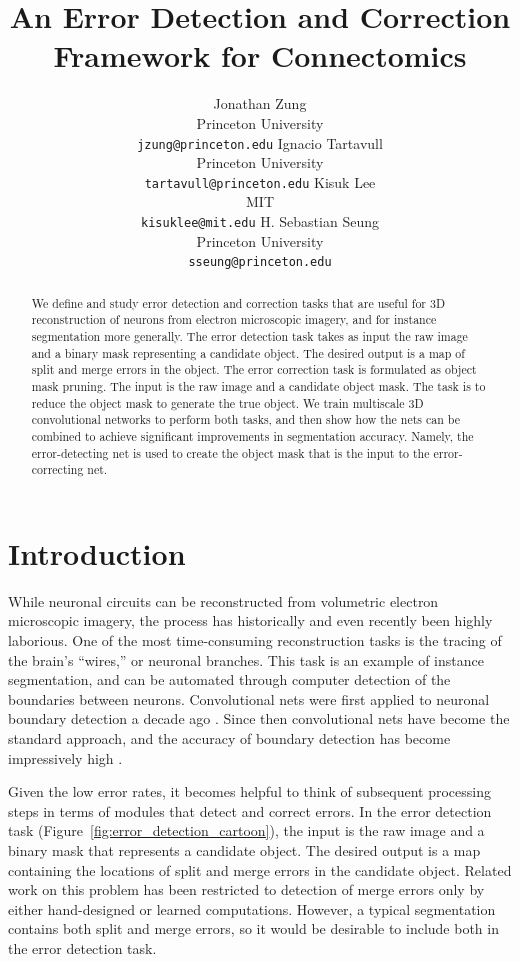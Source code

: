 \documentclass{article}
\title{An Error Detection and Correction Framework for Connectomics}
\author{
	Jonathan Zung\\
	Princeton University\\
	{\tt jzung@princeton.edu}
	\And
	Ignacio Tartavull\\
	Princeton University\\
	{\tt tartavull@princeton.edu}
	\And
	Kisuk Lee\\
	MIT\\
	{\tt kisuklee@mit.edu}
	\And
    H. Sebastian Seung\\
	Princeton University\\
	{\tt sseung@princeton.edu}
}
\begin{document}
\maketitle

\begin{abstract}
We define and study error detection and correction tasks that are
useful for 3D reconstruction of neurons from electron microscopic
imagery, and for instance segmentation more generally.  The error
detection task takes as input the raw image and a binary mask
representing a candidate object. The desired output is a map of split
and merge errors in the object. The error correction task is
formulated as object mask pruning. The input is the raw image
and a candidate object mask. The task is to reduce the object mask to
generate the true object. We train multiscale 3D convolutional
networks to perform both tasks, and then show how the nets can be
combined to achieve significant improvements in segmentation
accuracy. Namely, the error-detecting net is used to create the
object mask that is the input to the error-correcting net.
\end{abstract}

\section{Introduction}
While neuronal circuits can be reconstructed from volumetric electron
microscopic imagery, the process has historically
\cite{white1986structure} and even recently \cite{schmidt2017axonal}
been highly laborious. One of the most time-consuming reconstruction
tasks is the tracing of the brain's ``wires,'' or neuronal branches.
This task is an example of instance segmentation, and can be automated through computer detection of the boundaries between neurons. Convolutional nets were first applied to neuronal boundary detection a decade ago \cite{jain2007supervised, boundary_detection}.
Since then convolutional nets have become the standard approach, and
the accuracy of boundary detection has become impressively high  \cite{zeng2017deep, beier2017multicut, kisuk, funke2017deep}.

Given the low error rates, it becomes helpful to think of subsequent processing steps in terms of modules that detect and correct errors. In the error detection task (Figure~\ref{fig:error_detection_cartoon}), the input is the raw image and a binary mask that represents a candidate object. The desired output is a map containing the locations of split and merge errors in the candidate object. Related work on this problem has been restricted to detection of merge errors only by either hand-designed \cite{multipass} or learned \cite{mergenet} computations. However, a typical segmentation contains both split and merge errors, so it would be desirable to include both in the error detection task.
\end{document}
